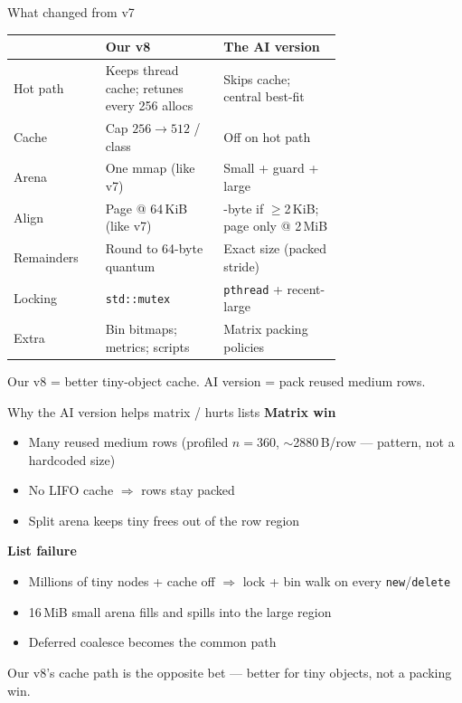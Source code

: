 \begin{frame}{What changed from v7}
    \centering
    \footnotesize
    \renewcommand{\arraystretch}{1.45}
    \setlength{\tabcolsep}{8pt}
    \begin{tabular}{@{}l
      >{\raggedright\arraybackslash}p{0.36\linewidth}
      >{\raggedright\arraybackslash}p{0.36\linewidth}@{}}
        \toprule
        & \centering\textbf{Our v8} &
          \centering\textbf{The AI version}\tabularnewline
        \midrule
        Hot path &
          Keeps thread cache;
          retunes every 256 allocs &
          Skips cache;
          central best-fit \\
        Cache &
          Cap \(256\rightarrow512\) / class &
          Off on hot path \\
        Arena &
          One mmap (like v7) &
          Small + guard + large \\
        Align &
          Page @ 64\,KiB (like v7) &
          64-byte if \(\ge\)2\,KiB;
          page only @ 2\,MiB \\
        Remainders &
          Round to 64-byte quantum &
          Exact size (packed stride) \\
        Locking &
          \texttt{std::mutex} &
          \texttt{pthread} + recent-large \\
        Extra &
          Bin bitmaps; metrics; scripts &
          Matrix packing policies \\
        \bottomrule
    \end{tabular}

    \vspace{0.75em}
    \raggedright
    {\small Our v8 = better tiny-object cache.\quad
    AI version = pack reused medium rows.}
\end{frame}

\begin{frame}{Why the AI version helps matrix / hurts lists}
    \textbf{Matrix win}
    \begin{itemize}
        \item Many reused medium rows (profiled \(n{=}360\),
              \(\sim\)2880\,B/row --- pattern, not a hardcoded size)
        \item No LIFO cache \(\Rightarrow\) rows stay packed
        \item Split arena keeps tiny frees out of the row region
    \end{itemize}

    \vspace{0.45em}
    \textbf{List failure}
    \begin{itemize}
        \item Millions of tiny nodes + cache off \(\Rightarrow\)
              lock + bin walk on every \texttt{new}/\texttt{delete}
        \item 16\,MiB small arena fills and spills into the large region
        \item Deferred coalesce becomes the common path
    \end{itemize}

    \vspace{0.4em}
    {\footnotesize Our v8's cache path is the opposite bet --- better for
    tiny objects, not a packing win.}
\end{frame}

